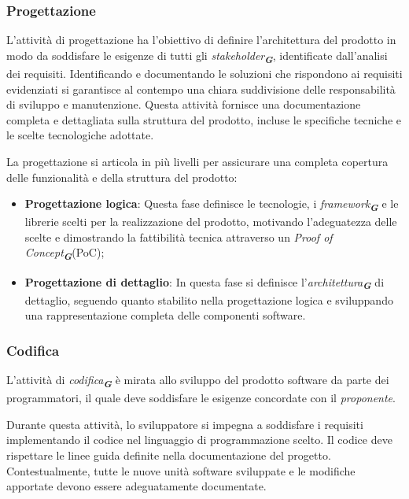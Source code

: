 \begin{enumerate}
\subsubsection{Progettazione}

L'attività di progettazione ha l'obiettivo di definire l'architettura del prodotto in modo da soddisfare le esigenze di tutti gli \emph{stakeholder}\textsubscript{\textit{\textbf{G}}}, identificate dall’analisi dei requisiti. Identificando e documentando le soluzioni che rispondono ai requisiti evidenziati si garantisce al contempo una chiara suddivisione delle responsabilità di sviluppo e manutenzione. Questa attività fornisce una documentazione completa e dettagliata sulla struttura del prodotto, incluse le specifiche tecniche e le scelte tecnologiche adottate. 

La progettazione si articola in più livelli per assicurare una completa copertura delle funzionalità e della struttura del prodotto:
\begin{itemize}
    \item \textbf{Progettazione logica}: Questa fase definisce le tecnologie, i \emph{framework}\textsubscript{\textit{\textbf{G}}} e le librerie scelti per la realizzazione del prodotto, motivando l'adeguatezza delle scelte e dimostrando la fattibilità tecnica attraverso un \emph{Proof of Concept}\textsubscript{\textit{\textbf{G}}}(PoC);
    \item \textbf{Progettazione di dettaglio}: In questa fase si definisce l'\emph{architettura}\textsubscript{\textit{\textbf{G}}} di dettaglio, seguendo quanto stabilito nella progettazione logica e sviluppando una rappresentazione completa delle componenti software.
\end{itemize}

\subsubsection{Codifica}

L’attività di \emph{codifica}\textsubscript{\textit{\textbf{G}}} è mirata allo sviluppo del prodotto software da parte dei programmatori, il quale deve soddisfare le esigenze concordate con il \emph{proponente}.


Durante questa attività, lo sviluppatore si impegna a soddisfare i requisiti implementando il codice nel linguaggio di programmazione scelto.
Il codice deve rispettare le linee guida definite nella documentazione del progetto. Contestualmente, tutte le nuove unità software sviluppate e le modifiche apportate devono essere adeguatamente documentate.


\end{enumerate}
